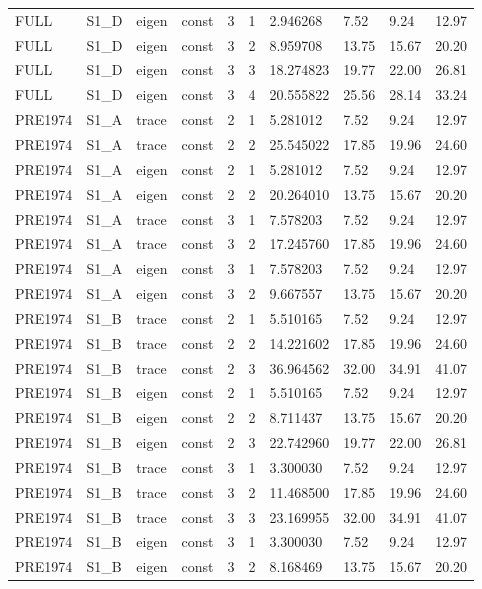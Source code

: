 \begin{tabular}{llllllllll}
FULL & S1\_D & eigen & const & 3 & 1 & 2.946268 & 7.52 & 9.24 & 12.97 \\
FULL & S1\_D & eigen & const & 3 & 2 & 8.959708 & 13.75 & 15.67 & 20.20 \\
FULL & S1\_D & eigen & const & 3 & 3 & 18.274823 & 19.77 & 22.00 & 26.81 \\
FULL & S1\_D & eigen & const & 3 & 4 & 20.555822 & 25.56 & 28.14 & 33.24 \\
PRE1974 & S1\_A & trace & const & 2 & 1 & 5.281012 & 7.52 & 9.24 & 12.97 \\
PRE1974 & S1\_A & trace & const & 2 & 2 & 25.545022 & 17.85 & 19.96 & 24.60 \\
PRE1974 & S1\_A & eigen & const & 2 & 1 & 5.281012 & 7.52 & 9.24 & 12.97 \\
PRE1974 & S1\_A & eigen & const & 2 & 2 & 20.264010 & 13.75 & 15.67 & 20.20 \\
PRE1974 & S1\_A & trace & const & 3 & 1 & 7.578203 & 7.52 & 9.24 & 12.97 \\
PRE1974 & S1\_A & trace & const & 3 & 2 & 17.245760 & 17.85 & 19.96 & 24.60 \\
PRE1974 & S1\_A & eigen & const & 3 & 1 & 7.578203 & 7.52 & 9.24 & 12.97 \\
PRE1974 & S1\_A & eigen & const & 3 & 2 & 9.667557 & 13.75 & 15.67 & 20.20 \\
PRE1974 & S1\_B & trace & const & 2 & 1 & 5.510165 & 7.52 & 9.24 & 12.97 \\
PRE1974 & S1\_B & trace & const & 2 & 2 & 14.221602 & 17.85 & 19.96 & 24.60 \\
PRE1974 & S1\_B & trace & const & 2 & 3 & 36.964562 & 32.00 & 34.91 & 41.07 \\
PRE1974 & S1\_B & eigen & const & 2 & 1 & 5.510165 & 7.52 & 9.24 & 12.97 \\
PRE1974 & S1\_B & eigen & const & 2 & 2 & 8.711437 & 13.75 & 15.67 & 20.20 \\
PRE1974 & S1\_B & eigen & const & 2 & 3 & 22.742960 & 19.77 & 22.00 & 26.81 \\
PRE1974 & S1\_B & trace & const & 3 & 1 & 3.300030 & 7.52 & 9.24 & 12.97 \\
PRE1974 & S1\_B & trace & const & 3 & 2 & 11.468500 & 17.85 & 19.96 & 24.60 \\
PRE1974 & S1\_B & trace & const & 3 & 3 & 23.169955 & 32.00 & 34.91 & 41.07 \\
PRE1974 & S1\_B & eigen & const & 3 & 1 & 3.300030 & 7.52 & 9.24 & 12.97 \\
PRE1974 & S1\_B & eigen & const & 3 & 2 & 8.168469 & 13.75 & 15.67 & 20.20 \\

\end{tabular}
